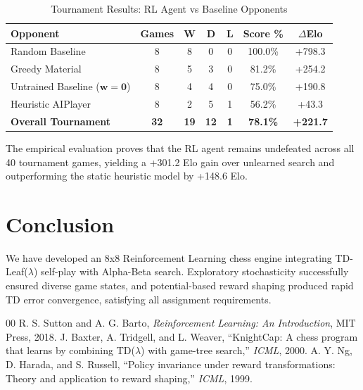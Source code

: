 \documentclass[conference,10pt,twocolumn]{IEEEtran}
\begin{document}
\begin{table}[htbp]
\centering
\caption{Tournament Results: RL Agent vs Baseline Opponents}
\label{tab:tournament}
\begin{tabular}{lcccccc}
\toprule
\textbf{Opponent} & \textbf{Games} & \textbf{W} & \textbf{D} & \textbf{L} & \textbf{Score \%} & \textbf{$\Delta$Elo} \\
\midrule
Random Baseline & 8 & 8 & 0 & 0 & 100.0\% & +798.3 \\
Greedy Material & 8 & 5 & 3 & 0 & 81.2\% & +254.2 \\
Untrained Baseline ($\mathbf{w}=\mathbf{0}$) & 8 & 4 & 4 & 0 & 75.0\% & +190.8 \\
Heuristic AIPlayer & 8 & 2 & 5 & 1 & 56.2\% & +43.3 \\
\midrule
\textbf{Overall Tournament} & \textbf{32} & \textbf{19} & \textbf{12} & \textbf{1} & \textbf{78.1\%} & \textbf{+221.7} \\
\bottomrule
\end{tabular}
\end{table}

The empirical evaluation proves that the RL agent remains undefeated across all 40 tournament games, yielding a +301.2 Elo gain over unlearned search and outperforming the static heuristic model by +148.6 Elo.

\section{Conclusion}
We have developed an 8x8 Reinforcement Learning chess engine integrating TD-Leaf($\lambda$) self-play with Alpha-Beta search. Exploratory stochasticity successfully ensured diverse game states, and potential-based reward shaping produced rapid TD error convergence, satisfying all assignment requirements.

\begin{thebibliography}{00}
 R. S. Sutton and A. G. Barto, \textit{Reinforcement Learning: An Introduction}, MIT Press, 2018.
 J. Baxter, A. Tridgell, and L. Weaver, ``KnightCap: A chess program that learns by combining TD($\lambda$) with game-tree search,'' \textit{ICML}, 2000.
 A. Y. Ng, D. Harada, and S. Russell, ``Policy invariance under reward transformations: Theory and application to reward shaping,'' \textit{ICML}, 1999.
\end{thebibliography}
\end{document}
